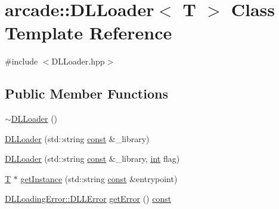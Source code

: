 \hypertarget{classarcade_1_1_d_l_loader}{\section{arcade\-:\-:D\-L\-Loader$<$ T $>$ Class Template Reference}
\label{classarcade_1_1_d_l_loader}
}


{\ttfamily \#include $<$D\-L\-Loader.\-hpp$>$}

\subsection*{Public Member Functions}
\begin{DoxyCompactItemize}
\item 
\hyperlink{classarcade_1_1_d_l_loader_a9c7b88b3afeeb737d6f82d8f0f46549e}{$\sim$\-D\-L\-Loader} ()
\item 
\hyperlink{classarcade_1_1_d_l_loader_acab16702d27a78854cb92d24328c80ca}{D\-L\-Loader} (std\-::string \hyperlink{term__entry_8h_a57bd63ce7f9a353488880e3de6692d5a}{const} \&\-\_\-library)
\item 
\hyperlink{classarcade_1_1_d_l_loader_a20163a23b6a1a7c107c0933006f6e413}{D\-L\-Loader} (std\-::string \hyperlink{term__entry_8h_a57bd63ce7f9a353488880e3de6692d5a}{const} \&\-\_\-library, \hyperlink{term__entry_8h_ad65b480f8c8270356b45a9890f6499ae}{int} flag)
\item 
\hyperlink{curses_8priv_8h_a5ef253115820acf7d27f3c5c3b02a0f0}{T} $\ast$ \hyperlink{classarcade_1_1_d_l_loader_a3f456d1976d3aa8089a9c3df4a7a6739}{get\-Instance} (std\-::string \hyperlink{term__entry_8h_a57bd63ce7f9a353488880e3de6692d5a}{const} \&entrypoint)
\item 
\hyperlink{classarcade_1_1_d_l_loading_error_a84cd98868dfc8c4a27e8e524919778ab}{D\-L\-Loading\-Error\-::\-D\-L\-L\-Error} \hyperlink{classarcade_1_1_d_l_loader_a3c36c528f83b540a5fbc3d6c788c8c8b}{get\-Error} () \hyperlink{term__entry_8h_a57bd63ce7f9a353488880e3de6692d5a}{const} 
\end{DoxyCompactItemize}


